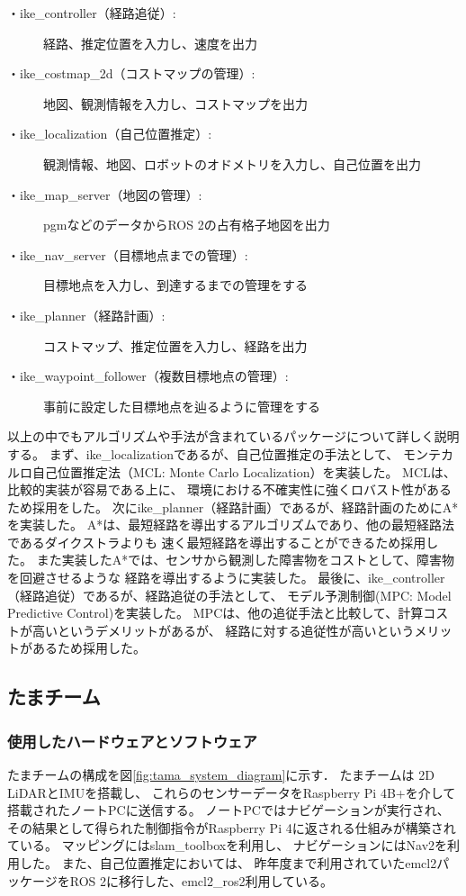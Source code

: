 \documentclass[twocolumn,9pt]{jsproceedings}
\begin{document}
\begin{description}
  \item[・ike\_controller（経路追従）:]経路、推定位置を入力し、速度を出力
  \item[・ike\_costmap\_2d（コストマップの管理）:]地図、観測情報を入力し、コストマップを出力
  \item[・ike\_localization（自己位置推定）:]観測情報、地図、ロボットのオドメトリを入力し、自己位置を出力
  \item[・ike\_map\_server（地図の管理）:]pgmなどのデータからROS 2の占有格子地図を出力
  \item[・ike\_nav\_server（目標地点までの管理）:]目標地点を入力し、到達するまでの管理をする
  \item[・ike\_planner（経路計画）:]コストマップ、推定位置を入力し、経路を出力
  \item[・ike\_waypoint\_follower（複数目標地点の管理）:]事前に設定した目標地点を辿るように管理をする
\end{description}

以上の中でもアルゴリズムや手法が含まれているパッケージについて詳しく説明する。
まず、ike\_localizationであるが、自己位置推定の手法として、
モンテカルロ自己位置推定法（MCL: Monte Carlo Localization）\cite{fox1999etal}を実装した。
MCLは、比較的実装が容易である上に、
環境における不確実性に強くロバスト性があるため採用をした。
次にike\_planner（経路計画）であるが、経路計画のためにA*\cite{hart1968}を実装した。
A*は、最短経路を導出するアルゴリズムであり、他の最短経路法であるダイクストラ\cite{dijkstra1959}よりも
速く最短経路を導出することができるため採用した。
また実装したA*では、センサから観測した障害物をコストとして、障害物を回避させるような
経路を導出するように実装した。
最後に、ike\_controller（経路追従）であるが、経路追従の手法として、
モデル予測制御(MPC: Model Predictive Control)\cite{alberto2006}を実装した。
MPCは、他の追従手法と比較して、計算コストが高いというデメリットがあるが、
経路に対する追従性が高いというメリットがあるため採用した。


\subsection{たまチーム}\label{sub:localization}

\subsubsection{使用したハードウェアとソフトウェア}

たまチームの構成を図\ref{fig:tama_system_diagram}に示す．
たまチームは 2D LiDARとIMUを搭載し、
これらのセンサーデータをRaspberry Pi 4B+を介して搭載されたノートPCに送信する。
ノートPCではナビゲーションが実行され、
その結果として得られた制御指令がRaspberry Pi 4に返される仕組みが構築されている。
マッピングにはslam\_toolboxを利用し、
ナビゲーションにはNav2を利用した。
また、自己位置推定においては、
昨年度まで利用されていたemcl2パッケージをROS 2に移行した、emcl2\_ros2利用している。
\end{document}
